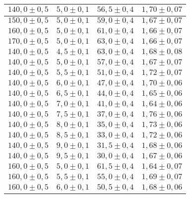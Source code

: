 \documentclass[12pt,a4paper,titlepage,headinclude,bibtotoc]{scrartcl}
\numberwithin{equation}{section}
\begin{document}
\begin{table}[h!]
\begin{tabular}{|c|c|c|c|}
		 \hline                         
		 $140,0 \pm 0,5$ & $5,0 \pm 0,1$& $56,5 \pm 0,4$ & $1,70 \pm 0,07$\\
		 \hline                         
		 $150,0 \pm 0,5$ & $5,0 \pm 0,1$& $59,0 \pm 0,4$ & $1,67 \pm 0,07$\\
		 \hline                         
		 $160,0 \pm 0,5$ & $5,0 \pm 0,1$& $61,0 \pm 0,4$ & $1,66 \pm 0,07$\\
		 \hline                         
		 $170,0 \pm 0,5$ & $5,0 \pm 0,1$& $63,0 \pm 0,4$ & $1,66 \pm 0,07$\\
		 \hline                         
		 $140,0 \pm 0,5$ & $4,5 \pm 0,1$& $63,0 \pm 0,4$ & $1,68 \pm 0,08$\\
		 \hline                         
		 $140,0 \pm 0,5$ & $5,0 \pm 0,1$& $57,0 \pm 0,4$ & $1,67 \pm 0,07$\\
		 \hline                         
		 $140,0 \pm 0,5$ & $5,5 \pm 0,1$& $51,0 \pm 0,4$ & $1,72 \pm 0,07$\\
		 \hline                         
		 $140,0 \pm 0,5$ & $6,0 \pm 0,1$& $47,0 \pm 0,4$ & $1,70 \pm 0,06$\\
		 \hline                         
		 $140,0 \pm 0,5$ & $6,5 \pm 0,1$& $44,0 \pm 0,4$ & $1,65 \pm 0,06$\\
		 \hline                         
		 $140,0 \pm 0,5$ & $7,0 \pm 0,1$& $41,0 \pm 0,4$ & $1,64 \pm 0,06$\\
		 \hline                         
		 $140,0 \pm 0,5$ & $7,5 \pm 0,1$& $37,0 \pm 0,4$ & $1,76 \pm 0,06$\\
		 \hline                         
		 $140,0 \pm 0,5$ & $8,0 \pm 0,1$& $35,0 \pm 0,4$ & $1,73 \pm 0,06$\\
		 \hline                         
		 $140,0 \pm 0,5$ & $8,5 \pm 0,1$& $33,0 \pm 0,4$ & $1,72 \pm 0,06$\\
		 \hline                         
		 $140,0 \pm 0,5$ & $9,0 \pm 0,1$& $31,5 \pm 0,4$ & $1,68 \pm 0,06$\\
		 \hline                         
		 $140,0 \pm 0,5$ & $9,5 \pm 0,1$& $30,0 \pm 0,4$ & $1,67 \pm 0,06$\\
		 \hline                         
		 $160,0 \pm 0,5$ & $5,0 \pm 0,1$& $61,5 \pm 0,4$ & $1,64 \pm 0,07$\\
		 \hline                         
		 $160,0 \pm 0,5$ & $5,5 \pm 0,1$& $55,0 \pm 0,4$ & $1,69 \pm 0,07$\\
		 \hline                         
		 $160,0 \pm 0,5$ & $6,0 \pm 0,1$& $50,5 \pm 0,4$ & $1,68 \pm 0,06$\\

\end{tabular}
\end{table}
\end{document}
